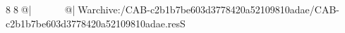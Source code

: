 8  8  @|                                                  @| W   archive:/CAB-c2b1b7be603d3778420a52109810adae/CAB-c2b1b7be603d3778420a52109810adae.resS 